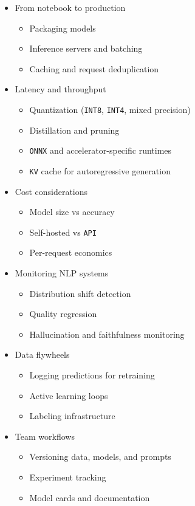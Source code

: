 \documentclass[
]{article}
\providecommand{\tightlist}{%
  \setlength{\itemsep}{0pt}\setlength{\parskip}{0pt}}
\begin{document}
\begin{itemize}
  \begin{itemize}
  \tightlist
  \item
    From notebook to production

    \begin{itemize}
    \tightlist
    \item
      Packaging models
    \item
      Inference servers and batching
    \item
      Caching and request deduplication
    \end{itemize}
  \item
    Latency and throughput

    \begin{itemize}
    \tightlist
    \item
      Quantization (\texttt{INT8}, \texttt{INT4}, mixed precision)
    \item
      Distillation and pruning
    \item
      \texttt{ONNX} and accelerator-specific runtimes
    \item
      \texttt{KV} cache for autoregressive generation
    \end{itemize}
  \item
    Cost considerations

    \begin{itemize}
    \tightlist
    \item
      Model size vs accuracy
    \item
      Self-hosted vs \texttt{API}
    \item
      Per-request economics
    \end{itemize}
  \item
    Monitoring NLP systems

    \begin{itemize}
    \tightlist
    \item
      Distribution shift detection
    \item
      Quality regression
    \item
      Hallucination and faithfulness monitoring
    \end{itemize}
  \item
    Data flywheels

    \begin{itemize}
    \tightlist
    \item
      Logging predictions for retraining
    \item
      Active learning loops
    \item
      Labeling infrastructure
    \end{itemize}
  \item
    Team workflows

    \begin{itemize}
    \tightlist
    \item
      Versioning data, models, and prompts
    \item
      Experiment tracking
    \item
      Model cards and documentation
    \end{itemize}
  \end{itemize}
\end{itemize}
\end{document}
